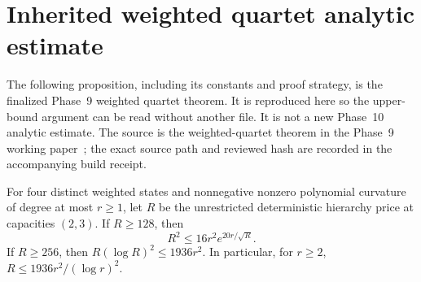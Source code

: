 \section{Inherited weighted quartet analytic estimate}
\label{sec:quartet-upper}


The following proposition, including its constants and proof strategy,
is the finalized Phase~9 weighted quartet theorem. It is reproduced here
so the upper-bound argument can be read without another file. It is not
a new Phase~10 analytic estimate. The source is the weighted-quartet theorem in the Phase~9 working
paper~\cite{huang9}; the exact source path and reviewed hash are recorded
in the accompanying build receipt.

\begin{proposition}
\label{prop:inherited}
For four distinct weighted states and nonnegative nonzero polynomial
curvature of degree at most $r\ge1$, let $R$ be the unrestricted
deterministic hierarchy price at capacities $(2,3)$. If $R\ge128$, then
\[
 R^2\le16r^2e^{20r/\sqrt R}.
\]
If $R\ge256$, then $R(\log R)^2\le1936r^2$. In particular, for $r\ge2$,
$R\le1936r^2/(\log r)^2$.
\end{proposition}

